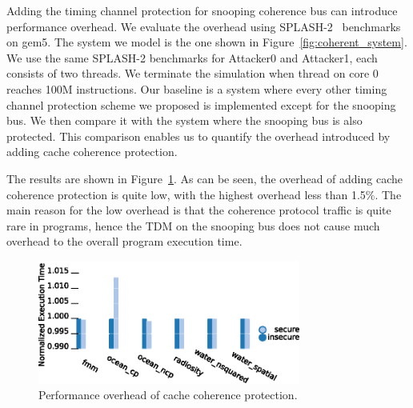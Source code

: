 Adding the timing channel protection for snooping coherence bus can introduce 
performance overhead. We evaluate the overhead using SPLASH-2~\cite{splash2} benchmarks on 
gem5. The system we model is the one shown in Figure~\ref{fig:coherent_system}.
We use the same SPLASH-2 benchmarks for Attacker0 and Attacker1, each consists 
of two threads. We terminate the simulation
when thread on core 0 reaches 100M instructions.  Our baseline is a system 
where every other timing channel protection scheme we proposed is implemented 
except for the snooping bus.
We then compare it with the system where the snooping bus is also protected. 
This comparison enables us to quantify the overhead introduced by adding 
cache coherence protection. 

The results are shown in Figure~\ref{fig:splash2}. As can be seen, the overhead 
of adding cache coherence protection is
quite low, with the highest overhead less than 1.5\%. 
The main reason for the low overhead is that the coherence protocol traffic 
is quite rare in programs, hence the TDM on the
snooping bus does not cause much overhead to the overall program execution 
time.

\begin{figure}
    \begin{center}
        \includegraphics[width=3.4in]{figs/SPLASH.eps}
        \caption{Performance overhead of cache coherence protection.}
        \label{fig:splash2}
		\vspace{-0.2in}
    \end{center}
\end{figure}
